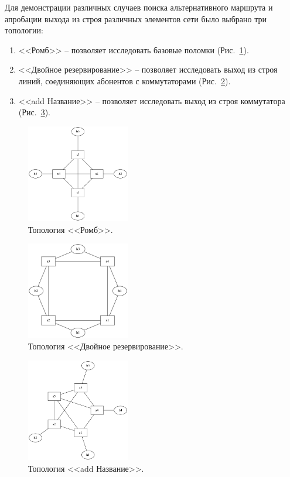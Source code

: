 \documentclass[12pt,fleqn]{article}
\begin{document}
Для демонстрации различных случаев поиска альтернативного маршрута и апробации выхода из строя различных элементов сети было выбрано три топологии:
\begin{enumerate}
	\item <<Ромб>> -- позволяет исследовать базовые поломки (Рис.~\ref{pic:4node}).
	\item <<Двойное резервирование>> -- позволяет исследовать выход из строя линий, соединяющих абонентов с коммутаторами (Рис.~\ref{pic:double}).
	\item <<add Название>> -- позволяет исследовать выход из строя коммутатора (Рис.~\ref{pic:5node}).
\end{enumerate}

\begin{figure}[h!]
	\centering
	\includegraphics[width=0.40\textwidth]{img/4node.png}
	\caption{Топология <<Ромб>>.}
	\label{pic:4node}
\end{figure}

\begin{figure}[h!]
	\centering
	\includegraphics[width=0.40\textwidth]{img/double.png}
	\caption[russian]{Топология <<Двойное резервирование>>.}
	\label{pic:double}
\end{figure}

\begin{figure}[h!]
	\centering
	\includegraphics[width=0.40\textwidth]{img/5node.png}
	\caption{Топология <<add Название>>.}
	\label{pic:5node}
\end{figure}
\end{document}
